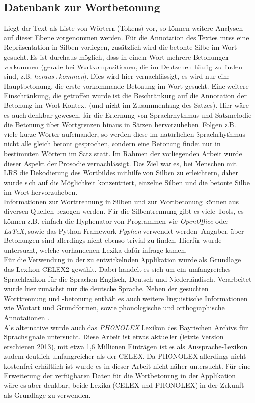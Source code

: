 \subsection{Datenbank zur Wortbetonung}
\label{sec:forschung-database}

Liegt der Text als Liste von Wörtern (Tokens) vor, so können weitere Analysen auf dieser Ebene vorgenommen werden. Für die Annotation des Textes muss eine Repräsentation in Silben vorliegen, zusätzlich wird die betonte Silbe im Wort gesucht. Es ist durchaus möglich, dass in einem Wort mehrere Betonungen vorkommen (gerade bei Wortkompositionen, die im Deutschen häufig zu finden sind, z.B. \textit{heraus+kommen}). Dies wird hier vernachlässigt, es wird nur eine Hauptbetonung, die erste vorkommende Betonung im Wort gesucht. Eine weitere Einschränkung, die getroffen wurde ist die Beschränkung auf die Annotation der Betonung im Wort-Kontext (und nicht im Zusammenhang des Satzes). Hier wäre es auch denkbar gewesen, für die Erlernung von Sprachrhythmus und Satzmelodie die Betonung über Wortgrenzen hinaus in Sätzen hervorzuheben. Folgen z.B. viele kurze Wörter aufeinander, so werden diese im natürlichen Sprachrhythmus nicht alle gleich betont gesprochen, sondern eine Betonung findet nur in bestimmten Wörtern im Satz statt. Im Rahmen der vorliegenden Arbeit wurde dieser Aspekt der Prosodie vernachlässigt. Das Ziel war es, bei Menschen mit LRS die Dekodierung des Wortbildes mithilfe von Silben zu erleichtern, daher wurde sich auf die Möglichkeit konzentriert, einzelne Silben und die betonte Silbe im Wort hervorzuheben.\\

Informationen zur Worttrennung in Silben und zur Wortbetonung können aus diversen Quellen bezogen werden. Für die Silbentrennung gibt es viele Tools, es können z.B. einfach die Hyphenator von Programmen wie \textit{OpenOffice} oder \textit{LaTeX}, sowie das Python Framework \textit{Pyphen} verwendet werden. Angaben über Betonungen sind allerdings nicht ebenso trivial zu finden. Hierfür wurde untersucht, welche vorhandenen Lexika dafür infrage kamen.\\
Für die Verwendung in der zu entwickelnden Applikation wurde als Grundlage das Lexikon CELEX2 gewählt. Dabei handelt es sich um ein umfangreiches Sprachlexikon für die Sprachen Englisch, Deutsch und Niederländisch. Verarbeitet wurde hier zunächst nur die deutsche Sprache. Neben der gesuchten Worttrennung und -betonung enthält es auch weitere linguistische Informationen wie Wortart und Grundformen, sowie phonologische und orthographische Annotationen \cite{Burnage1990}.\\
Als alternative wurde auch das \textit{PHONOLEX} Lexikon des Bayrischen Archivs für Sprachsignale\cite{phonolex} untersucht. Diese Arbeit ist etwas aktueller (letzte Version erschienen 2013), mit etwa 1,6 Millionen Einträgen ist es als Aussprache-Lexikon zudem deutlich umfangreicher als der CELEX\cite{Schiel1999}. Da PHONOLEX allerdings nicht kostenfrei erhältlich ist wurde es in dieser Arbeit nicht näher untersucht. Für eine Erweiterung der verfügbaren Daten für die Wortbetonung in der Applikation wäre es aber denkbar, beide Lexika (CELEX und PHONOLEX) in der Zukunft als Grundlage zu verwenden.\\

